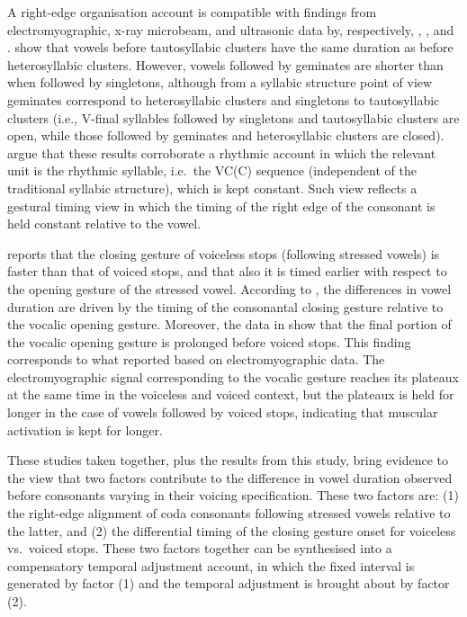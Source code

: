 \documentclass[preprint]{JASAnew}
\begin{document}
A right-edge organisation account is compatible with findings from
electromyographic, x-ray microbeam, and ultrasonic data by,
respectively, \citet{raphael1975}, \citet{de-jong1991}, and
\citet{celata2018}. \citet{celata2018} show that vowels before
tautosyllabic clusters have the same duration as before heterosyllabic
clusters. However, vowels followed by geminates are shorter than when
followed by singletons, although from a syllabic structure point of view
geminates correspond to heterosyllabic clusters and singletons to
tautosyllabic clusters (i.e., V-final syllables followed by singletons
and tautosyllabic clusters are open, while those followed by geminates
and heterosyllabic clusters are closed). \citet{celata2018} argue that
these results corroborate a rhythmic account in which the relevant unit
is the rhythmic syllable, i.e.~the VC(C) sequence (independent of the
traditional syllabic structure), which is kept constant. Such view
reflects a gestural timing view in which the timing of the right edge of
the consonant is held constant relative to the vowel.

\citet{de-jong1991} reports that the closing gesture of voiceless stops
(following stressed vowels) is faster than that of voiced stops, and
that also it is timed earlier with respect to the opening gesture of the
stressed vowel. According to \citet{de-jong1991}, the differences in
vowel duration are driven by the timing of the consonantal closing
gesture relative to the vocalic opening gesture. Moreover, the data in
\citet{de-jong1991} show that the final portion of the vocalic opening
gesture is prolonged before voiced stops. This finding corresponds to
what \citet{raphael1975} reported based on electromyographic data. The
electromyographic signal corresponding to the vocalic gesture reaches
its plateaux at the same time in the voiceless and voiced context, but
the plateaux is held for longer in the case of vowels followed by voiced
stops, indicating that muscular activation is kept for longer.

These studies taken together, plus the results from this study, bring
evidence to the view that two factors contribute to the difference in
vowel duration observed before consonants varying in their voicing
specification. These two factors are: (1) the right-edge alignment of
coda consonants following stressed vowels relative to the latter, and
(2) the differential timing of the closing gesture onset for voiceless
vs.~voiced stops. These two factors together can be synthesised into a
compensatory temporal adjustment account, in which the fixed interval is
generated by factor (1) and the temporal adjustment is brought about by
factor (2).
\end{document}
